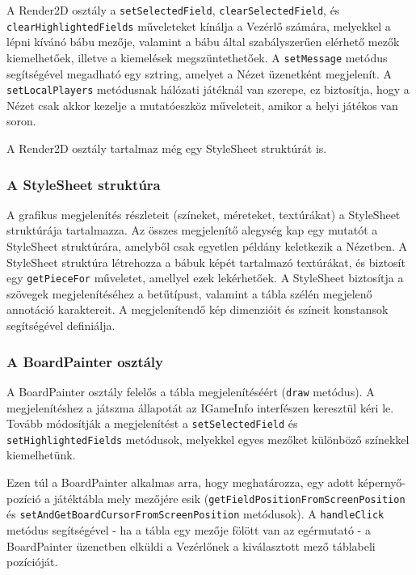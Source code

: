 \documentclass[12pt, twoside]{report}
\begin{document}
A Render2D osztály a {\tt setSelectedField}, {\tt clearSelectedField},  és {\tt clearHighlightedFields} műveleteket kínálja a Vezérlő számára, melyekkel a lépni kívánó bábu mezője, valamint a bábu által szabályszerűen elérhető mezők kiemelhetőek, illetve a kiemelések megszüntethetőek. A {\tt setMessage} metódus segítségével megadható egy sztring, amelyet a Nézet üzenetként megjelenít. A {\tt setLocalPlayers} metódusnak hálózati játéknál van szerepe, ez biztosítja, hogy a Nézet csak akkor kezelje a mutatóeszköz műveleteit, amikor a helyi játékos van soron.

A Render2D osztály tartalmaz még egy StyleSheet struktúrát is.

\subsubsection{A StyleSheet struktúra}

A grafikus megjelenítés részleteit (színeket, méreteket, textúrákat) a StyleSheet struktúrája tartalmazza. Az összes megjelenítő alegység kap egy mutatót a StyleSheet struktúrára, amelyből csak egyetlen példány keletkezik a Nézetben. A StyleSheet struktúra létrehozza a bábuk képét tartalmazó textúrákat, és biztosít egy {\tt getPieceFor} műveletet, amellyel ezek lekérhetőek. A StyleSheet biztosítja a szövegek megjelenítéséhez a betűtípust, valamint a tábla szélén megjelenő annotáció karaktereit. A megjelenítendő kép dimenzióit és színeit konstansok segítségével definiálja. 

\subsubsection{A BoardPainter osztály}

A BoardPainter osztály felelős a tábla megjelenítéséért ({\tt draw} metódus). A megjelenítéshez a játszma állapotát az IGameInfo interfészen keresztül kéri le. Tovább módosítják a megjelenítést a {\tt setSelectedField} és {\tt setHighlightedFields} metódusok, melyekkel egyes mezőket különböző színekkel kiemelhetünk.

Ezen túl a BoardPainter alkalmas arra, hogy meghatározza, egy adott képernyő-pozíció a játéktábla mely mezőjére esik ({\tt getFieldPositionFromScreenPosition} és {\tt setAndGetBoardCursorFromScreenPosition} metódusok). A {\tt handleClick} metódus segítségével - ha a tábla egy mezője fölött van az egérmutató - a BoardPainter üzenetben elküldi a Vezérlőnek a kiválasztott mező táblabeli pozícióját.
\end{document}
